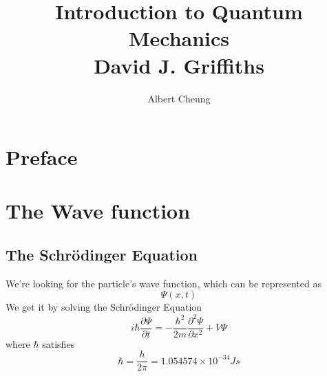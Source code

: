 \documentclass{article}
\author{Albert Cheung}
\title{Introduction to Quantum Mechanics\\ David J. Griffiths}
\numberwithin{equation}{section}
\begin{document}
	
	\maketitle
	\thispagestyle{empty} %


	\newpage
    \thispagestyle{empty} %
    \section*{Preface}


	\newpage
	\pagestyle{fancy}
	\fancyhf{} %
	\fancyhead[L]{\nouppercase{\leftmark}} %
	\fancyhead[R]{} %
	\renewcommand{\headrulewidth}{0.4pt} %
	\renewcommand{\footrulewidth}{0pt} %
	\fancyfoot[C]{\thepage} %
	\fancypagestyle{plain}{ %
		\fancyhf{}
		\fancyhead[L]{\nouppercase{\leftmark}}
		\fancyhead[R]{}
		\fancyfoot[C]{\thepage} %
		\renewcommand{\headrulewidth}{0.4pt}
	}
	
	\tableofcontents
	\thispagestyle{empty} %
	
	\newpage
	\setcounter{page}{1} %

\section{The Wave function}
\subsection{The Schrödinger Equation}

We're looking for the particle's wave function, which can be represented as
\begin{equation}
\Psi(x,t)
\end{equation}
We get it by solving the Schrödinger Equation
\begin{equation}
i\hbar\frac{\partial \Psi}{\partial t}=-\frac{\hbar^2}{2m}\frac{\partial^2\Psi}{\partial x^2}+V\Psi
\end{equation}
where $\hbar$ satisfies
\begin{equation}
	\hbar=\frac{h}{2\pi}=1.054574\times10^{-34}J s
\end{equation}
\end{document}
